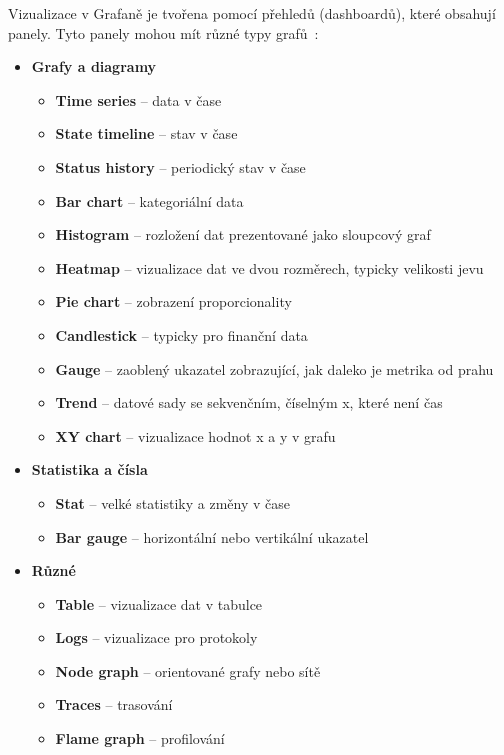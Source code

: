 Vizualizace v Grafaně je tvořena pomocí přehledů (dashboardů), které obsahují panely. Tyto panely mohou mít různé typy grafů~\cite{GrafanaVisualization}:
\begin{itemize}
    \item \textbf{Grafy a diagramy}
    \begin{itemize}
        \item \textbf{Time series} – data v čase
        \item \textbf{State timeline} – stav v čase
        \item \textbf{Status history} – periodický stav v čase
        \item \textbf{Bar chart} – kategoriální data
        \item \textbf{Histogram} – rozložení dat prezentované jako sloupcový graf
        \item \textbf{Heatmap} – vizualizace dat ve dvou rozměrech, typicky velikosti jevu
        \item \textbf{Pie chart} – zobrazení proporcionality
        \item \textbf{Candlestick} – typicky pro finanční data
        \item \textbf{Gauge} – zaoblený ukazatel zobrazující, jak daleko je metrika od prahu
        \item \textbf{Trend} – datové sady se sekvenčním, číselným x, které není čas
        \item \textbf{XY chart} – vizualizace hodnot x a y v grafu
    \end{itemize}
    \item \textbf{Statistika a čísla}
    \begin{itemize}
        \item \textbf{Stat} – velké statistiky a změny v čase
        \item \textbf{Bar gauge} – horizontální nebo vertikální ukazatel
    \end{itemize}
    \item \textbf{Různé}
    \begin{itemize}
        \item \textbf{Table} – vizualizace dat v tabulce
        \item \textbf{Logs} – vizualizace pro protokoly
        \item \textbf{Node graph} – orientované grafy nebo sítě
        \item \textbf{Traces} – trasování
        \item \textbf{Flame graph} – profilování

\end{itemize}
\end{itemize}
